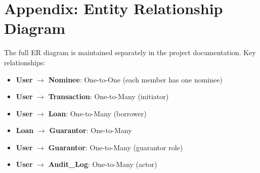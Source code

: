 \documentclass[11pt,a4paper]{article}
\begin{document}
\section{Appendix: Entity Relationship Diagram}

The full ER diagram is maintained separately in the project documentation. Key relationships:

\begin{itemize}
    \item \textbf{User} $\rightarrow$ \textbf{Nominee}: One-to-One (each member has one nominee)
    \item \textbf{User} $\rightarrow$ \textbf{Transaction}: One-to-Many (initiator)
    \item \textbf{User} $\rightarrow$ \textbf{Loan}: One-to-Many (borrower)
    \item \textbf{Loan} $\rightarrow$ \textbf{Guarantor}: One-to-Many
    \item \textbf{User} $\rightarrow$ \textbf{Guarantor}: One-to-Many (guarantor role)
    \item \textbf{User} $\rightarrow$ \textbf{Audit\_Log}: One-to-Many (actor)
\end{itemize}
\end{document}
